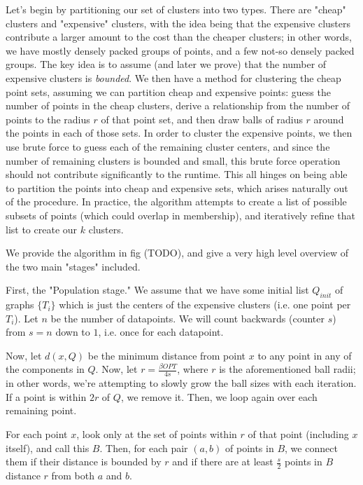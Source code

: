 \documentclass[paper=a4, fontsize=10.5pt]{scrartcl} %
\numberwithin{equation}{section} %
\numberwithin{figure}{section} %
\numberwithin{table}{section} %
\begin{document}
Let's begin by partitioning our set of clusters into two types.  There are  "cheap" clusters and "expensive" clusters, with the idea being that the expensive clusters contribute a larger amount to the cost than the cheaper clusters; in other words, we have mostly densely packed groups of points, and a few not-so densely packed groups.  The key idea is to assume (and later we prove) that the number of expensive clusters is \emph{bounded}.  We then have a method for clustering the cheap point sets, assuming we can partition cheap and expensive points: guess the number of points in the cheap clusters, derive a relationship from the number of points to the radius $r$ of that point set, and then draw balls of radius $r$ around the points in each of those sets.  In order to cluster the expensive points, we then use brute force to guess each of the remaining cluster centers, and since the number of remaining clusters is bounded and small, this brute force operation should not contribute significantly to the runtime.  This all hinges on being able to partition the points into cheap and expensive sets, which arises naturally out of the procedure.  In practice, the algorithm attempts to create a list of possible subsets of points (which could overlap in membership), and iteratively refine that list to create our $k$ clusters. 



We provide the algorithm in fig (TODO), and give a very high level overview of the two main "stages" included.

First, the "Population stage."  We assume that we have some initial list $Q_{init}$ of graphs $\{T_i\}$ which is just the centers of the expensive clusters (i.e. one point per $T_i$).  Let $n$ be the number of datapoints.  We will count backwards (counter $s$) from $s=n$ down to $1$, i.e. once for each datapoint.

Now, let $d(x, Q)$ be the minimum distance from point $x$ to any point in any of the components in $Q$.  Now, let $r = \frac{\beta OPT}{4 s}$, where $r$ is the aforementioned ball radii; in other words, we're attempting to slowly grow the ball sizes with each iteration.  If a point is within $2r$ of $Q$, we remove it. Then, we loop again over each remaining point.

For each point $x$, look only at the set of points within $r$ of that point (including $x$ itself), and call this $B$.  Then, for each pair $(a, b)$ of points in $B$, we connect them if their distance is bounded by $r$ and if there are at least $\frac{s}{2}$ points in $B$ distance $r$ from both $a$ and $b$.
\end{document}
